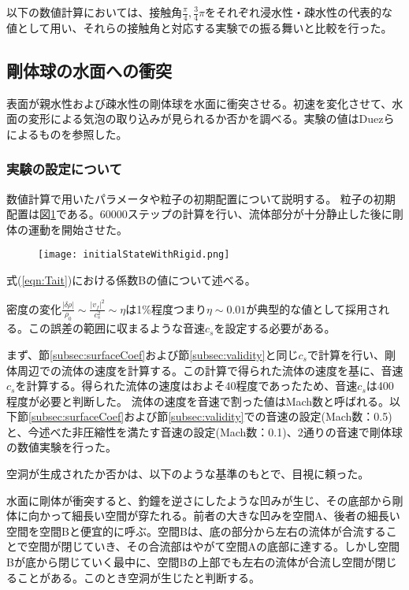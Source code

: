 \documentclass[]{jsarticle}
\begin{document}
以下の数値計算においては、接触角$\frac{\pi}{4},\frac{3}{4}\pi$をそれぞれ浸水性・疎水性の代表的な値として用い、それらの接触角と対応する実験での振る舞いと比較を行った。


\newpage
\subsection{剛体球の水面への衝突}
表面が親水性および疎水性の剛体球を水面に衝突させる。初速を変化させて、水面の変形による気泡の取り込みが見られるか否かを調べる。実験の値はDuez\cite{Duez2007}らによるものを参照した。

\subsubsection{実験の設定について}
数値計算で用いたパラメータや粒子の初期配置について説明する。
粒子の初期配置は図\ref{fig:initialStateWithRigid}である。60000ステップの計算を行い、流体部分が十分静止した後に剛体の運動を開始させた。
\begin{figure}[ht]
  \centering
  \texttt{[image: initialStateWithRigid.png]}
  \caption{\label{fig:initialStateWithRigid} }
\end{figure}



式(\ref{eqn:Tait})における係数Bの値について述べる。

密度の変化$\frac{\left| \delta \rho \right|}{\rho_0}\sim \frac{\left| v_f \right|^2}{c_s^2}\sim\eta$は1\%程度つまり$\eta\sim 0.01$が典型的な値として採用される\cite{Becker2007}。この誤差の範囲に収まるような音速$c_s$を設定する必要がある。

まず、節\ref{subsec:surfaceCoef}および節\ref{subsec:validity}と同じ$c_s$で計算を行い、剛体周辺での流体の速度を計算する。この計算で得られた流体の速度を基に、音速$c_s$を計算する。得られた流体の速度はおよそ40程度であったため、音速$c_s$は400程度が必要と判断した。
流体の速度を音速で割った値はMach数と呼ばれる。以下節\ref{subsec:surfaceCoef}および節\ref{subsec:validity}での音速の設定(Mach数：0.5)と、今述べた非圧縮性を満たす音速の設定(Mach数：0.1)、2通りの音速で剛体球の数値実験を行った。


空洞が生成されたか否かは、以下のような基準のもとで、目視に頼った。

水面に剛体が衝突すると、釣鐘を逆さにしたような凹みが生じ、その底部から剛体に向かって細長い空間が穿たれる。前者の大きな凹みを空間A、後者の細長い空間を空間Bと便宜的に呼ぶ。空間Bは、底の部分から左右の流体が合流することで空間が閉じていき、その合流部はやがて空間Aの底部に達する。しかし空間Bが底から閉じていく最中に、空間Bの上部でも左右の流体が合流し空間が閉じることがある。このとき空洞が生じたと判断する。
\end{document}
